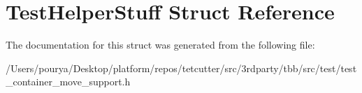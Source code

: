 \hypertarget{structTestHelperStuff}{}\section{Test\+Helper\+Stuff Struct Reference}
\label{structTestHelperStuff}


The documentation for this struct was generated from the following file\+:\begin{DoxyCompactItemize}
\item 
/\+Users/pourya/\+Desktop/platform/repos/tetcutter/src/3rdparty/tbb/src/test/test\+\_\+container\+\_\+move\+\_\+support.\+h\end{DoxyCompactItemize}
